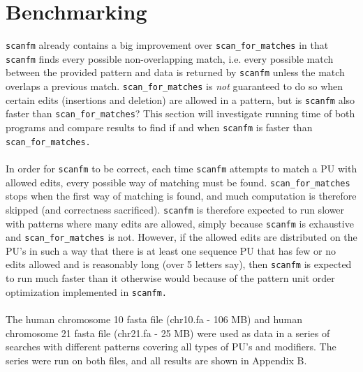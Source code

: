 \documentclass[12pt]{article}
\newcommand{\scm}{\texttt{scan\_for\_matches} }
\newcommand{\scmp}{\texttt{scan\_for\_matches.} }
\newcommand{\sfm}{\texttt{scanfm} }
\newcommand{\sfmp}{\texttt{scanfm.} }
\newcommand{\pu}{PU }
\newcommand{\pus}{PU's }
\begin{document}
\section{Benchmarking}
\sfm already contains a big improvement over \scm in that \sfm finds every possible non-overlapping match, i.e.
every possible match between the provided pattern and data is returned by \sfm unless the match overlaps a previous match.
\scm is \emph{not} guaranteed to do so when certain edits (insertions and deletion) are allowed in a pattern, but is \sfm
also faster than \texttt{scan\_for\_matches}?
This section will investigate running time of both programs and compare results to find if and when \sfm is faster
than \scmp \\ \\
In order for \sfm to be correct, each time \sfm attempts to match a \pu with allowed edits, every possible way of 
matching must be found. \scm stops when the first way of matching is found, and much computation is therefore skipped 
(and correctness sacrificed). \sfm is therefore expected to run slower with patterns where many edits are allowed, simply
because \sfm is exhaustive and \scm is not. However, if the allowed edits are distributed on the \pus in such a way
that there is at least one sequence \pu that has few or no edits allowed and is reasonably long (over 5 letters say),
then \sfm is expected to run much faster than it otherwise would because of the pattern unit order optimization 
implemented in \sfmp \\ \\
The human chromosome 10 fasta file (chr10.fa - 106 MB) and human chromosome 21 fasta file (chr21.fa - 25 MB) 
were used as data in a series
of searches with different patterns covering all types of \pus and modifiers. The series were run on both files,
and all results are shown in Appendix B.
\end{document}
